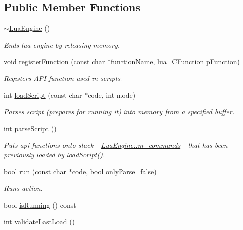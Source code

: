 \subsection*{Public Member Functions}
\begin{DoxyCompactItemize}
\item 
\hyperlink{class_lua_engine_ac72949ef59ee17465ce653f0c02c3eab}{$\sim$\-Lua\-Engine} ()
\begin{DoxyCompactList}\small\item\em Ends lua engine by releasing memory. \end{DoxyCompactList}\item 
void \hyperlink{class_lua_engine_a03530362918aceccd6f69a5cecf2a968}{register\-Function} (const char $\ast$function\-Name, lua\-\_\-\-C\-Function p\-Function)
\begin{DoxyCompactList}\small\item\em Registers A\-P\-I function used in scripts. \end{DoxyCompactList}\item 
int \hyperlink{class_lua_engine_aab9337ae5ea59bccc1e08c4015d42700}{load\-Script} (const char $\ast$code, int mode)
\begin{DoxyCompactList}\small\item\em Parses script (prepares for running it) into memory from a specified buffer. \end{DoxyCompactList}\item 
int \hyperlink{class_lua_engine_a5eae05f78704166f098ea20568c23fd7}{parse\-Script} ()
\begin{DoxyCompactList}\small\item\em Puts api functions onto stack -\/ \hyperlink{class_lua_engine_a86a3f32127e36e1ccce6c5a42a298ad5}{Lua\-Engine\-::m\-\_\-commands} -\/ that has been previously loaded by \hyperlink{class_lua_engine_aab9337ae5ea59bccc1e08c4015d42700}{load\-Script()}. \end{DoxyCompactList}\item 
bool \hyperlink{class_lua_engine_a38430b2be86fac999acd740423ec1fc8}{run} (const char $\ast$code, bool only\-Parse=false)
\begin{DoxyCompactList}\small\item\em Runs action. \end{DoxyCompactList}\item 
bool \hyperlink{class_lua_engine_a6187bc7b6aed29babb68b62da1520710}{is\-Running} () const 
\item 
int \hyperlink{class_lua_engine_ab039ca83afd2466f9fe52fcc69adfefb}{validate\-Last\-Load} ()

\end{DoxyCompactItemize}
